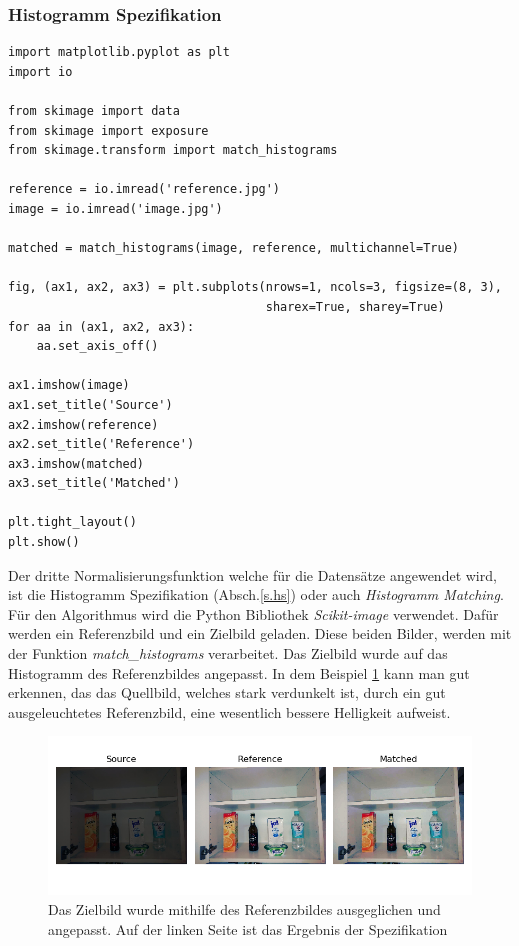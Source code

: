 \documentclass[a4paper,12pt,oneside]{article}
\begin{document}
\subsubsection{Histogramm Spezifikation}
\begin{lstlisting}
import matplotlib.pyplot as plt
import io

from skimage import data
from skimage import exposure
from skimage.transform import match_histograms

reference = io.imread('reference.jpg')
image = io.imread('image.jpg')

matched = match_histograms(image, reference, multichannel=True)

fig, (ax1, ax2, ax3) = plt.subplots(nrows=1, ncols=3, figsize=(8, 3),
                                    sharex=True, sharey=True)
for aa in (ax1, ax2, ax3):
    aa.set_axis_off()

ax1.imshow(image)
ax1.set_title('Source')
ax2.imshow(reference)
ax2.set_title('Reference')
ax3.imshow(matched)
ax3.set_title('Matched')

plt.tight_layout()
plt.show()
\end{lstlisting}
Der dritte Normalisierungsfunktion welche für die Datensätze angewendet wird, ist die Histogramm Spezifikation (Absch.\ref{s.hs}) oder auch \textit{Histogramm Matching}. Für den Algorithmus wird die Python Bibliothek \textit{Scikit-image} verwendet. Dafür werden ein Referenzbild und ein Zielbild geladen. Diese beiden Bilder, werden mit der Funktion \textit{match\_histograms} verarbeitet. Das Zielbild wurde auf das Histogramm des Referenzbildes angepasst. In dem Beispiel \ref{img:histogramspez} kann man gut erkennen, das das Quellbild, welches stark verdunkelt ist, durch ein gut ausgeleuchtetes Referenzbild, eine wesentlich bessere Helligkeit aufweist.
\begin{figure}
	[h]
	\centering
	\includegraphics[scale=0.8]{Sources/HS_beispiel.png}
	\caption{Das Zielbild wurde mithilfe des Referenzbildes ausgeglichen und angepasst. Auf der linken Seite ist das Ergebnis der Spezifikation}
	\label{img:histogramspez}
\end{figure}
  \newpage
\end{document}
